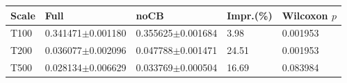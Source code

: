 \begin{tabular}{lllll}
\hline
Scale & Full & noCB & Impr.(\%) & Wilcoxon $p$ \\
\hline
T100 & 0.341471$\pm$0.001180 & 0.355625$\pm$0.001684 & 3.98 & 0.001953 \\
T200 & 0.036077$\pm$0.002096 & 0.047788$\pm$0.001471 & 24.51 & 0.001953 \\
T500 & 0.028134$\pm$0.006629 & 0.033769$\pm$0.000504 & 16.69 & 0.083984 \\
\hline
\end{tabular}

